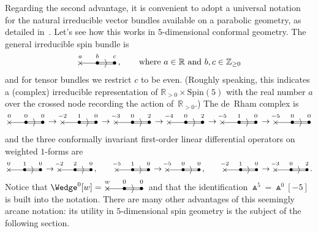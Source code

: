 \documentclass[pdftex]{sigma}%
\numberwithin{equation}{section}
\newcommand{\bthree}[3]{\begin{picture}(48,11)
\put(4,1.5){\makebox(0,0){$\times$}}
\put(24,1.5){\makebox(0,0){$\bullet$}}
\put(44,1.5){\makebox(0,0){$\bullet$}}
\put(4,1.5){\line(1,0){20}}
\put(23,2.5){\line(1,0){20}}
\put(23,0.5){\line(1,0){20}}
\put(34,1.5){\makebox(0,0){$\rangle$}}
\put(4,10){\makebox(0,0){$\vphantom{(}\scriptstyle #1$}}
\put(24,10){\makebox(0,0){$\vphantom{(}\scriptstyle #2$}}
\put(44,10){\makebox(0,0){$\vphantom{(}\scriptstyle #3$}}
\end{picture}}
\begin{document}
Regarding the second advantage, it is convenient to adopt a universal notation
for the natural irreducible vector bundles available on a parabolic geometry,
as detailed in~\cite{BE,CS}. Let's see how this works in $5$-dimensional
conformal geometry. The general irreducible spin bundle is
\[\bthree{a}{b}{c},\qquad\mbox{where}\ a\in{\mathbb{R}}\
\mbox{and}\ b,c\in{\mathbb{Z}}_{\geq 0}\]
and for tensor bundles we restrict $c$ to be even. (Roughly speaking, this
indicates a (complex) irreducible representation of
${\mathbb{R}}_{>0}\times{\mathrm{Spin(5)}}$ with the real number $a$ over the
crossed node recording the action of~${\mathbb{R}}_{>0}$.) The de~Rham complex
is
\begin{equation}\label{deRham5dim}
\bthree{0}{0}{0}\to\bthree{-2}{1}{0}\to\bthree{-3}{0}{2}
\to\bthree{-4}{0}{2}\to\bthree{-5}{1}{0}\to\bthree{-5}{0}{0}\end{equation}
and the three conformally invariant first-order linear differential operators
on weighted $1$-forms are
\[\bthree{0}{1}{0}\to\bthree{-2}{2}{0},\qquad
\bthree{-5}{1}{0}\to\bthree{-5}{0}{0},\qquad
\bthree{-2}{1}{0}\to\bthree{-3}{0}{2}.\]
Notice that $\Wedge^0[w]=\bthree{w}{0}{0}$ and that the identification
$\Wedge^5=\Wedge^0[-5]$ is built into the notation. There are many other
advantages of this seemingly arcane notation: its utility in $5$-dimensional
spin geometry is the subject of the following section.
\end{document}
